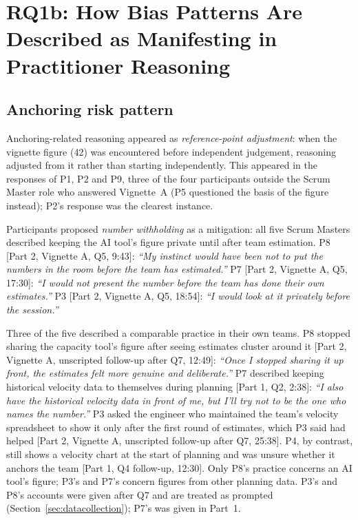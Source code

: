 \documentclass[a4paper,twoside]{bth}
\begin{document}
\section{RQ1b: How Bias Patterns Are Described as Manifesting in Practitioner Reasoning}
\label{sec:rq1b}

\subsection{Anchoring risk pattern}

Anchoring-related reasoning appeared as \textit{reference-point adjustment}: when the vignette figure (42) was encountered before independent judgement, reasoning adjusted from it rather than starting independently. This appeared in the responses of P1, P2 and P9, three of the four participants outside the Scrum Master role who answered Vignette~A (P5 questioned the basis of the figure instead); P2's response was the clearest instance.

Participants proposed \textit{number withholding} as a mitigation: all five Scrum Masters described keeping the AI tool's figure private until after team estimation. P8 [Part 2, Vignette A, Q5, 9:43]: \textit{``My instinct would have been not to put the numbers in the room before the team has estimated.''} P7 [Part 2, Vignette A, Q5, 17:30]: \textit{``I would not present the number before the team has done their own estimates.''} P3 [Part 2, Vignette A, Q5, 18:54]: \textit{``I would look at it privately before the session.''}

Three of the five described a comparable practice in their own teams. P8 stopped sharing the capacity tool's figure after seeing estimates cluster around it [Part 2, Vignette A, unscripted follow-up after Q7, 12:49]: \textit{``Once I stopped sharing it up front, the estimates felt more genuine and deliberate.''} P7 described keeping historical velocity data to themselves during planning [Part 1, Q2, 2:38]: \textit{``I also have the historical velocity data in front of me, but I'll try not to be the one who names the number.''} P3 asked the engineer who maintained the team's velocity spreadsheet to show it only after the first round of estimates, which P3 said had helped [Part 2, Vignette A, unscripted follow-up after Q7, 25:38]. P4, by contrast, still shows a velocity chart at the start of planning and was unsure whether it anchors the team [Part 1, Q4 follow-up, 12:30]. Only P8's practice concerns an AI tool's figure; P3's and P7's concern figures from other planning data. P3's and P8's accounts were given after Q7 and are treated as prompted (Section~\ref{sec:datacollection}); P7's was given in Part~1.
\end{document}

